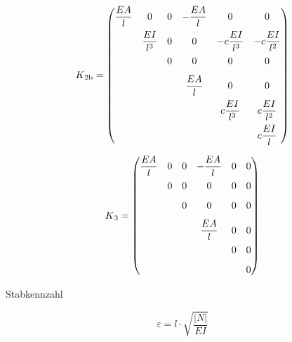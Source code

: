 \begin{equation} \label{K2b}
K\textsubscript{2b} = \begin{pmatrix}
\dfrac{EA}{l} & 0                   & 0                   & -\dfrac{EA}{l}  & 0                   & 0                   \\[0.8em]
              & \dfrac{EI}{l^3}     & 0                   & 0               & -c\dfrac{EI}{l^3}   & -c\dfrac{EI}{l^2}   \\[0.8em]
              &                     & 0                   & 0               & 0                   & 0                   \\[0.8em]
              &                     &                     & \dfrac{EA}{l}   & 0                   & 0                   \\[0.8em]
              &                     &                     &                 & c\dfrac{EI}{l^3}    & c\dfrac{EI}{l^2}    \\[0.8em]
              &                     &                     &                 &                     & c\dfrac{EI}{l}
     \end{pmatrix}
\end{equation}

\begin{equation} \label{K3}
K\textsubscript{3} = \begin{pmatrix}
\dfrac{EA}{l} & 0                   & 0                   & -\dfrac{EA}{l}  & 0                   & 0                   \\[0.8em]
              & 0                   & 0                   & 0               & 0                   & 0                   \\[0.8em]
              &                     & 0                   & 0               & 0                   & 0                   \\[0.8em]
              &                     &                     & \dfrac{EA}{l}   & 0                   & 0                   \\[0.8em]
              &                     &                     &                 & 0                   & 0                   \\[0.8em]
              &                     &                     &                 &                     & 0
     \end{pmatrix}
\end{equation}

Stabkennzahl 

\begin{equation} \label{e}
\varepsilon = l \cdot \sqrt{\frac{|N|}{EI}}
\end{equation}

